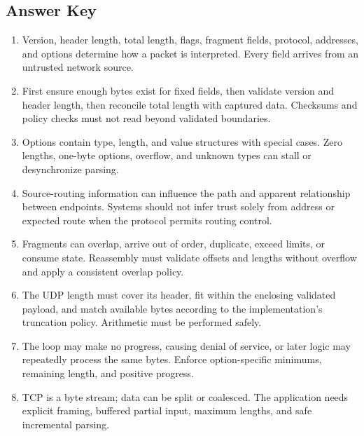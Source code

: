 \documentclass[11pt,letterpaper]{article}
\begin{document}
\subsection*{Answer Key}
\begin{enumerate}
\item Version, header length, total length, flags, fragment fields, protocol, addresses, and options determine how a packet is interpreted. Every field arrives from an untrusted network source.
\item First ensure enough bytes exist for fixed fields, then validate version and header length, then reconcile total length with captured data. Checksums and policy checks must not read beyond validated boundaries.
\item Options contain type, length, and value structures with special cases. Zero lengths, one-byte options, overflow, and unknown types can stall or desynchronize parsing.
\item Source-routing information can influence the path and apparent relationship between endpoints. Systems should not infer trust solely from address or expected route when the protocol permits routing control.
\item Fragments can overlap, arrive out of order, duplicate, exceed limits, or consume state. Reassembly must validate offsets and lengths without overflow and apply a consistent overlap policy.
\item The UDP length must cover its header, fit within the enclosing validated payload, and match available bytes according to the implementation's truncation policy. Arithmetic must be performed safely.
\item The loop may make no progress, causing denial of service, or later logic may repeatedly process the same bytes. Enforce option-specific minimums, remaining length, and positive progress.
\item TCP is a byte stream; data can be split or coalesced. The application needs explicit framing, buffered partial input, maximum lengths, and safe incremental parsing.
\end{enumerate}
\end{document}
